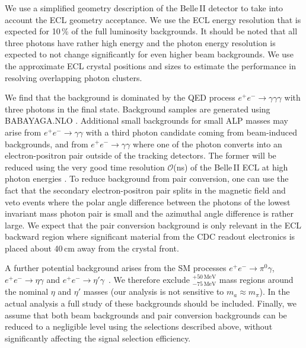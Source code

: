 \documentclass[11pt,a4paper]{article}
\def \belletwo {Belle\,II\xspace}
\begin{document}
We use a simplified geometry description of the \belletwo detector to take into account the ECL geometry acceptance. We use the ECL energy resolution \cite{lit:b2tip} that is expected for 10\,\% of the full luminosity backgrounds. It should be noted that all three photons have rather high energy and the photon energy resolution is expected to not change significantly for even higher beam backgrounds. We use the approximate ECL crystal positions and sizes to estimate the performance in resolving overlapping photon clusters.

We find that the background is dominated by the QED process $e^+e^-\to\gamma\gamma\gamma$ with three photons in the final state. Background samples are generated using BABAYAGA.NLO \cite{CarloniCalame:2003yt, CarloniCalame:2001ny, CarloniCalame:2000pz}. Additional small backgrounds for small ALP masses may arise from $e^+e^-\to\gamma\gamma$ with a third photon candidate coming from beam-induced backgrounds, and from $e^+e^-\to\gamma\gamma$ where one of the photon converts into an electron-positron pair outside of the tracking detectors. The former will be reduced using the very good time resolution $\mathcal{O}$(ns) of the \belletwo ECL at high photon energies \cite{Aulchenko:2017lmh}. To reduce background from pair conversion, one can use the fact that the secondary electron-positron pair splits in the magnetic field and veto events where the polar angle difference between the photons of the lowest invariant mass photon pair is small and the azimuthal angle difference is rather large. We expect that the pair conversion background is only relevant in the ECL backward region where significant material from the CDC readout electronics is placed about 40\,cm away from the crystal front. 

A further potential background arises from the SM processes $e^+e^- \to \pi^0 \gamma$, $e^+e^- \to \eta \gamma$ and  $e^+e^- \to \eta' \gamma$~\cite{Czyz:2017veo}. We therefore exclude $_{-75\,\text{MeV}}^{+50\,\text{MeV}}$ mass regions around the nominal $\eta$ and $\eta'$ masses (our analysis is not sensitive to $m_a \approx m_\pi$). In the actual analysis a full study of these backgrounds should be included. Finally, we assume that both beam backgrounds and pair conversion backgrounds can be reduced to a negligible level using the selections described above, without significantly affecting the signal selection efficiency. 
\end{document}
